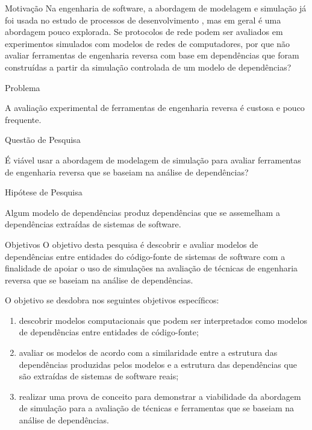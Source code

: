 \begin{section}{Motivação}
		Na engenharia de software, a abordagem de modelagem e simulação já foi usada no estudo de processos de desenvolvimento \cite{Stopford2008}, mas em geral é uma abordagem pouco explorada. Se protocolos de rede podem ser avaliados em experimentos simulados com modelos de redes de computadores, por que não avaliar ferramentas de engenharia reversa com base em dependências que foram construídas a partir da simulação controlada de um modelo de dependências?
		
\end{section}

\begin{section}{Problema}
	
	A avaliação experimental de ferramentas de engenharia reversa é custosa e pouco frequente.
	
\end{section}

\begin{section}{Questão de Pesquisa}
	
	É viável usar a abordagem de modelagem de simulação para avaliar ferramentas de engenharia reversa que se baseiam na análise de dependências?
	
\end{section}

\begin{section}{Hipótese de Pesquisa}
	
	Algum modelo de dependências produz dependências que se assemelham a dependências extraídas de sistemas de software.
	
\end{section}

\begin{section}{Objetivos}
	O objetivo desta pesquisa é descobrir e avaliar modelos de dependências entre entidades do código-fonte de sistemas de software com a finalidade de apoiar o uso de simulações na avaliação de técnicas de engenharia reversa que se baseiam na análise de dependências.
	
	O objetivo se desdobra nos seguintes objetivos específicos:
	
	\begin{enumerate}
		\item descobrir modelos computacionais que podem ser interpretados como modelos de dependências entre entidades de código-fonte;
		\item avaliar os modelos de acordo com a similaridade entre a estrutura das dependências produzidas pelos modelos e a estrutura das dependências que são extraídas de sistemas de software reais;
		\item realizar uma prova de conceito para demonstrar a viabilidade da abordagem de simulação para a avaliação de técnicas e ferramentas que se baseiam na análise de dependências.
	\end{enumerate}
	
\end{section}

